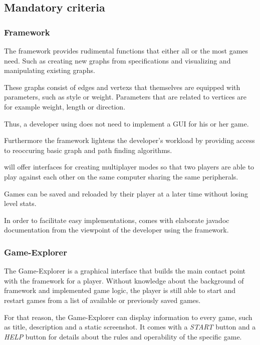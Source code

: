 \subsection{Mandatory criteria}
\label{mandatory-criteria}
\subsubsection{Framework}
The framework provides rudimental functions that either all or the most \glspl{game} need. Such as creating new \glspl{graph} from specifications and visualizing and manipulating existing graphs.\par
These graphs consist of \glspl{edge} and \glspl{vertex} that themselves are equipped with parameters, such as style or weight. Parameters that are related to vertices are for example weight, length or direction.\par
Thus, a \gls{developer} using {\graphioli} does not need to implement a \gls{GUI} for his or her game.\par
Furthermore the framework lightens the developer's workload by providing access to reoccuring basic graph and \gls{path} finding algorithms.\par
{\graphioli} will offer interfaces for creating multiplayer modes so that two \glspl{player} are able to play against each other on the same computer sharing the same peripherals.\par
Games can be saved and reloaded by their player at a later time without losing \gls{level} stats.\par
In order to facilitate easy implementations, {\graphioli} comes with elaborate \Gls{javadoc} documentation from the viewpoint of the developer using the framework.\par

\subsubsection{Game-Explorer}
The Game-Explorer is a graphical interface that builds the main contact point with the framework for a player. Without knowledge about the background of framework and implemented game logic, the player is still able to start and restart games from a list of available or previously saved games.\par
For that reason, the Game-Explorer can display information to every game, such as title, description and a static screenshot. It comes with a \emph{START} button  and a \emph{HELP} button for details about the rules and operability of the specific game.\par

